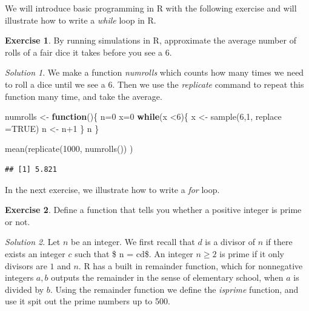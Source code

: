 \documentclass[
]{article}
\newenvironment{Shaded}{\begin{snugshade}}{\end{snugshade}}
\newcommand{\AttributeTok}[1]{\textcolor[rgb]{0.77,0.63,0.00}{#1}}
\newcommand{\ConstantTok}[1]{\textcolor[rgb]{0.00,0.00,0.00}{#1}}
\newcommand{\ControlFlowTok}[1]{\textcolor[rgb]{0.13,0.29,0.53}{\textbf{#1}}}
\newcommand{\DecValTok}[1]{\textcolor[rgb]{0.00,0.00,0.81}{#1}}
\newcommand{\FunctionTok}[1]{\textcolor[rgb]{0.00,0.00,0.00}{#1}}
\newcommand{\NormalTok}[1]{#1}
\newcommand{\OtherTok}[1]{\textcolor[rgb]{0.56,0.35,0.01}{#1}}
\newcommand{\SpecialCharTok}[1]{\textcolor[rgb]{0.00,0.00,0.00}{#1}}
\theoremstyle{definition}
\theoremstyle{definition}
\theoremstyle{definition}
\newtheorem{exercise}{Exercise}[section]
\theoremstyle{remark}
\newtheorem*{solution}{Solution}
\begin{document}
We will introduce basic programming in R with the following exercise and will illustrate how to write a \emph{while} loop in R.
\begin{exercise}
\protect\hypertarget{exr:unnamed-chunk-10}{}{\label{exr:unnamed-chunk-10} }By running simulations in R, approximate the average number of rolls of a fair dice it takes before you see a 6.
\end{exercise}
\begin{solution}
{}We make a function \emph{numrolls} which counts how many times we need to roll a dice until we see a \(6\). Then we use the \emph{replicate} command to repeat this function many time, and take the average.
\end{solution}

\begin{Shaded}
\begin{Highlighting}[]
\NormalTok{numrolls }\OtherTok{\textless{}{-}} \ControlFlowTok{function}\NormalTok{()\{}
\NormalTok{n}\OtherTok{=}\DecValTok{0}
\NormalTok{x}\OtherTok{=}\DecValTok{0}
\ControlFlowTok{while}\NormalTok{(x }\SpecialCharTok{\textless{}}\DecValTok{6}\NormalTok{)\{}
\NormalTok{x }\OtherTok{\textless{}{-}} \FunctionTok{sample}\NormalTok{(}\DecValTok{6}\NormalTok{,}\DecValTok{1}\NormalTok{, }\AttributeTok{replace =}\ConstantTok{TRUE}\NormalTok{)}
\NormalTok{n }\OtherTok{\textless{}{-}}\NormalTok{ n}\SpecialCharTok{+}\DecValTok{1}
\NormalTok{\}}
\NormalTok{n}
\NormalTok{\}}

\FunctionTok{mean}\NormalTok{(}\FunctionTok{replicate}\NormalTok{(}\DecValTok{1000}\NormalTok{, }\FunctionTok{numrolls}\NormalTok{()) )}
\end{Highlighting}
\end{Shaded}

\begin{verbatim}
## [1] 5.821
\end{verbatim}

In the next exercise, we illustrate how to write a \emph{for} loop.

\begin{exercise}
\protect\hypertarget{exr:unnamed-chunk-13}{}{\label{exr:unnamed-chunk-13} }Define a function that tells you whether a positive integer is prime or not.
\end{exercise}
\begin{solution}
{}Let \(n\) be an integer. We first recall that \(d\) is a divisor of \(n\) if there exists an integer \(c\) such that \$ n = cd\$. An integer \(n \geq 2\) is prime if it only divisors are \(1\) and \(n\). R has a built in remainder function, which for nonnegative integers \(a,b\) outputs the remainder in the sense of elementary school, when \(a\) is divided by \(b\). Using the remainder function we define the \emph{isprime} function, and use it spit out the prime numbers up to 500.
\end{solution}
\end{document}
